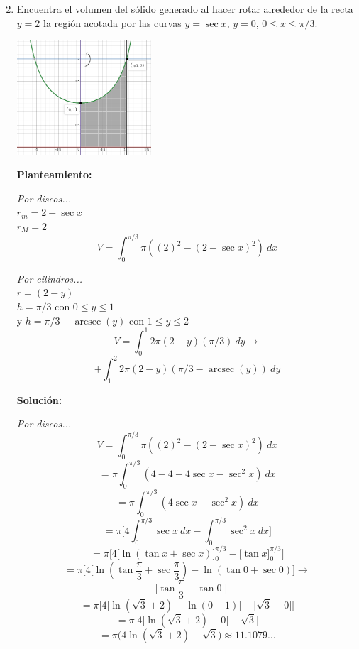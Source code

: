 \documentclass[10pt,letterpaper]{article}
\DeclareMathOperator{\arcsec}{arcsec}
\begin{document}
\begin{enumerate}
\begin{multicols}{2}
\end{multicols}
\newpage

\item Encuentra el volumen del sólido generado al hacer rotar alrededor de la recta $y=2$ la región
      acotada por las curvas $y = \sec x$, $y = 0$, $0 \leq x \leq \pi/3$.

\begin{multicols}{2}

\includegraphics[width=5cm]{Images/grafica3.png}

\textbf{Planteamiento:}

\textit{Por discos...} \\
$r_m = 2 - \sec x$ \\
$r_M = 2$
$$V = \int_{0}^{\pi/3} \pi ( (2)^2 - (2 - \sec x)^2 ) \ dx$$

\textit{Por cilindros...} \\
$r = (2-y)$ \\
$h = \pi/3$ con $0 \leq y \leq 1$ \\
y $h = \pi/3 - \arcsec(y)$ con $1 \leq y \leq 2$
$$V = \int_{0}^{1} 2\pi (2-y) (\pi/3)\ dy \rightarrow$$
$$+ \int_{1}^{2} 2\pi (2-y) ( \pi/3 - \arcsec(y) )\ dy$$

\textbf{Solución:}

\textit{Por discos...}
$$V = \int_{0}^{\pi/3} \pi ( (2)^2 - (2 - \sec x)^2 ) \ dx$$
$$= \pi \int_{0}^{\pi/3} (4 - 4 + 4\sec x - \sec^2 x)\ dx$$
$$= \pi \int_{0}^{\pi/3} (4\sec x - \sec^2 x)\ dx$$
$$= \pi \bigg[ 4 \int_{0}^{\pi/3} \sec x \ dx - \int_{0}^{\pi/3} \sec^2 x\ dx \bigg]$$
$$= \pi \bigg[ 4 \Big[ \ln{(\tan x+\sec x)} \Big]_{0}^{\pi/3} - \Big[ \tan x \Big]_{0}^{\pi/3} \bigg] $$
$$= \pi \bigg[ 4 \Big[ \ln{(\tan \frac{\pi}{3}+\sec \frac{\pi}{3})} - \ln{(\tan 0+\sec 0)} \Big] \rightarrow$$
$$- \Big[ \tan \frac{\pi}{3} - \tan 0 \Big] \bigg] $$
$$= \pi \bigg[ 4 \Big[ \ln{(\sqrt{3}+2)} - \ln{(0+1)} \Big] - \Big[ \sqrt{3} - 0 \Big] \bigg]$$
$$= \pi \bigg[ 4 \Big[ \ln{(\sqrt{3}+2)} - 0 \Big] - \sqrt{3} \bigg]$$
$$= \pi \bigg( 4 \ln{(\sqrt{3}+2)} - \sqrt{3} \bigg) \approx 11.1079...$$


\end{multicols}
\end{enumerate}
\end{document}
